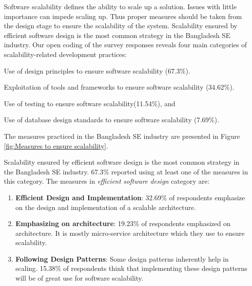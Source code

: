  Software scalability defines the ability to scale up a solution. Issues with little importance can impede scaling up. Thus proper measures should be taken from the design stage to ensure the scalability of the system. Scalability ensured by efficient software design is the most common strategy in the Bangladesh SE industry. Our open coding of the survey responses reveals four main categories of scalability-related development practices: 
\begin{inparaenum}
\item Use of design principles to ensure software scalability (67.3\%).
\item Exploitation of tools and frameworks to ensure software scalability (34.62\%). 
\item Use of testing to ensure software scalability(11.54\%), and
\item Use of database design standards to ensure software scalability (7.69\%).
\end{inparaenum} 
The measures practiced in the Bangladesh SE industry are presented in Figure \ref{fig:Measures to ensure scalability}.


 Scalability ensured by efficient software design is the most common strategy in the Bangladesh SE industry. 67.3\% reported using at least one of the measures in this category. The measures in \emph{efficient software design} category are:
 \begin{enumerate}[label=(\alph*)]
 
     \item \textbf{Efficient Design and Implementation}: 32.69\% of respondents emphasize on the design and implementation of a scalable architecture. 
    
     \item \textbf{Emphasizing on architecture}: 19.23\% of respondents emphasized on architecture. It is mostly micro-service architecture which they use to ensure scalability.

    
    \item \textbf{Following Design Patterns}: Some design patterns inherently help in scaling. 15.38\% of respondents think that implementing these design patterns will be of great use for software scalability.
 
 \end{enumerate}
 
